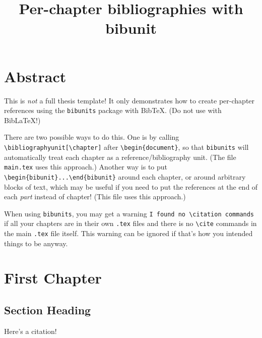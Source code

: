 \documentclass[11pt,oneside]{book}
\title{Per-chapter bibliographies with bibunit}
\begin{document}
\frontmatter

\chapter*{Abstract}
This is \emph{not} a full thesis template! It only demonstrates how to create per-chapter references using the \texttt{bibunits} package with BibTeX. (Do not use with BibLaTeX!)

There are two possible ways to do this. One is by calling \verb|\bibliographyunit[\chapter]| after \verb|\begin{document}|, so that \texttt{bibunits} will automatically treat each chapter as a reference/bibliography unit. (The file \texttt{main.tex} uses this approach.) Another way is to put \verb|\begin{bibunit}...\end{bibunit}| around each chapter, or around arbitrary blocks of text, which may be useful if you need to put the references at the end of each \textit{part} instead of chapter! (This file uses this approach.)

When using \texttt{bibunits}, you may get a warning \verb|I found no \citation commands| if all your chapters are in their own \texttt{.tex} files and there is no \verb|\cite| commands in the main \texttt{.tex} file itself. This warning can be ignored if that's how you intended things to be anyway.

\tableofcontents

\mainmatter

\chapter{First Chapter}

\begin{bibunit}
\section{Section Heading}
Here's a citation! \citep{latex:companion}

\putbib

\end{bibunit}
\end{document}
